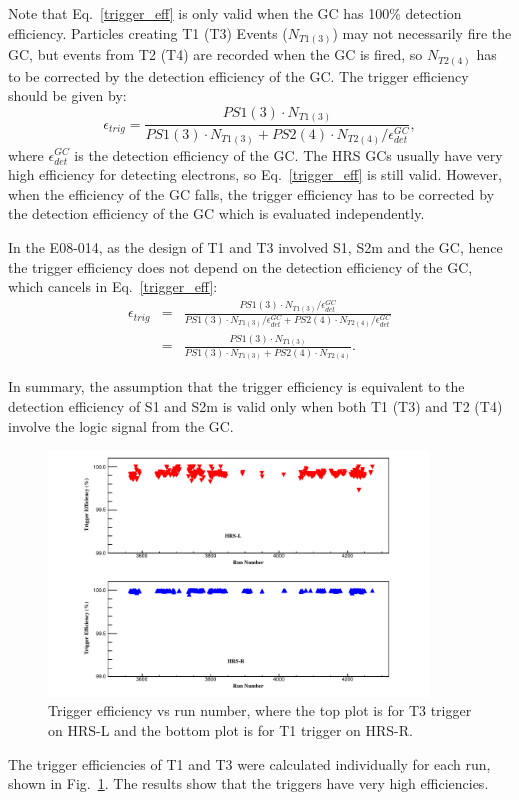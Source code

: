  Note that Eq.~\eqref{trigger_eff} is only valid when the GC has 100\% detection efficiency. Particles creating T1 (T3) Events ($N_{T1(3)}$) may not necessarily fire the GC, but events from T2 (T4) are recorded when the GC is fired, so $N_{T2(4)}$ has to be corrected by the detection efficiency of the GC. The trigger efficiency should be given by:
 \begin{equation}
  \epsilon_{trig} = \frac{PS1(3)\cdot N_{T1(3)}}{PS1(3) \cdot N_{T1(3)}+PS2(4)\cdot N_{T2(4)}/\epsilon^{GC}_{det}} 
  \label{trigger_eff2},
\end{equation}
where $\epsilon^{GC}_{det}$ is the detection efficiency of the GC. The HRS GCs usually have very high efficiency for detecting electrons, so Eq.~\eqref{trigger_eff} is still valid. However, when the efficiency of the GC falls, the trigger efficiency has to be corrected by the detection efficiency of the GC which is evaluated independently.

 In the E08-014, as the design of T1 and T3 involved S1, S2m and the GC, hence the trigger efficiency does not depend on the detection efficiency of the GC, which cancels in Eq.~\eqref{trigger_eff}:
 \begin{eqnarray}
 \epsilon_{trig} &=& \frac{PS1(3)\cdot N_{T1(3)}/\epsilon^{GC}_{det}}{PS1(3) \cdot N_{T1(3)}/\epsilon^{GC}_{det}+PS2(4)\cdot N_{T2(4)}/\epsilon^{GC}_{det}} \nonumber \\
                 &=& \frac{PS1(3)\cdot N_{T1(3)}}{PS1(3) \cdot N_{T1(3)}+PS2(4)\cdot N_{T2(4)}}.
  \label{trigger_eff3}
 \end{eqnarray}

 In summary, the assumption that the trigger efficiency is equivalent to the detection efficiency of S1 and S2m is valid only when both T1 (T3) and T2 (T4) involve the logic signal from the GC. 
\begin{figure}[!ht]
  \begin{center}
    \includegraphics[type=pdf,ext=.pdf,read=.pdf,width=0.9\textwidth]{./figures/scin/Trigger_Eff}
    \caption[Trigger efficiency vs run number]{\footnotesize{Trigger efficiency vs run number, where the top plot is for T3 trigger on HRS-L and the bottom plot is for T1 trigger on HRS-R.}}
    \label{trig_effi}
  \end{center}
\end{figure}
The trigger efficiencies of T1 and T3 were calculated individually for each run, shown in Fig.~\ref{trig_effi}. The results show that the triggers have very high efficiencies.

